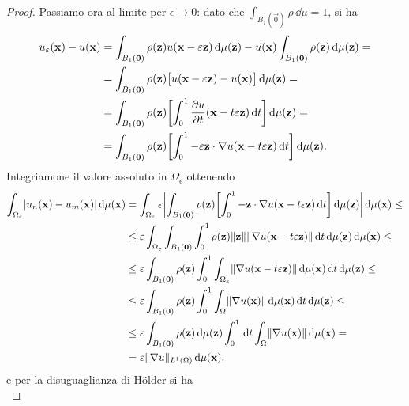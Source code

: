 \begin{proof}
    Passiamo ora al limite per $\epsilon\to 0$: dato che $\int_{B_1(\vec 0)}\rho\,\dd\mu=1$, si ha
    \begin{equation}
        \begin{split}
            u_\epsilon(\vec x)-u(\vec x)&=
            \int_{B_1(\vec 0)}\rho(\vec z)u(\vec x-\epsilon\vec z)\,\dd\mu(\vec z)-u(\vec x)\int_{B_1(\vec 0)}\rho(\vec z)\,\dd\mu(\vec z)=\\ &=
            \int_{B_1(\vec 0)}\rho(\vec z)\bigl[u(\vec x-\epsilon\vec z)-u(\vec x)\bigr]\,\dd\mu(\vec z)=\\ &=
            \int_{B_1(\vec 0)}\rho(\vec z)\biggl[\int_0^1\drp{u}{t}(\vec x-t\epsilon\vec z)\,\dd t\biggr]\,\dd\mu(\vec z)=\\ &=
            \int_{B_1(\vec 0)}\rho(\vec z)\biggl[\int_0^1-\epsilon\scalar{\vec z}{\grad u(\vec x-t\epsilon\vec z)}\,\dd t\biggr]\,\dd\mu(\vec z).
        \end{split}
    \end{equation}
    Integriamone il valore assoluto in $\Omega_\epsilon$ ottenendo
    \begin{equation}
        \begin{split}
            \int_{\Omega_\epsilon}\abs{u_n(\vec x)-u_m(\vec x)}\,\dd\mu(\vec x)&=
            \int_{\Omega_\epsilon}\epsilon\abs[\bigg]{\int_{B_1(\vec 0)}\rho(\vec z)\biggl[\int_0^1-\scalar{\vec z}{\grad u(\vec x-t\epsilon\vec z)}\,\dd t\biggr]\,\dd\mu(\vec z)}\,\dd\mu(\vec x)\le\\ &\le
            \epsilon\int_{\Omega_\epsilon}\int_{B_1(\vec 0)}\int_0^1\rho(\vec z)\norm{\vec z}\norm{\grad u(\vec x-t\epsilon\vec z)}\,\dd t\,\dd\mu(\vec z)\,\dd\mu(\vec x)\le\\ &\le
            \epsilon\int_{B_1(\vec 0)}\rho(\vec z)\int_0^1\int_{\Omega_\epsilon}\norm{\grad u(\vec x-t\epsilon\vec z)}\,\dd\mu(\vec x)\,\dd t\,\dd\mu(\vec z)\le\\ &\le
            \epsilon\int_{B_1(\vec 0)}\rho(\vec z)\int_0^1\int_\Omega\norm{\grad u(\vec x)}\,\dd\mu(\vec x)\,\dd t\,\dd\mu(\vec z)\le\\ &\le
            \epsilon\int_{B_1(\vec 0)}\rho(\vec z)\,\dd\mu(\vec z)\int_0^1\,\dd t\int_\Omega\norm{\grad u(\vec x)}\,\dd\mu(\vec x)=\\ &=
            \epsilon\norm{\grad u}_{\leb[1]{\Omega}}\,\dd\mu(\vec x),
        \end{split}
    \end{equation}
    e per la disuguaglianza di Hölder si ha
    \begin{equation}

\end{equation}
\end{proof}
